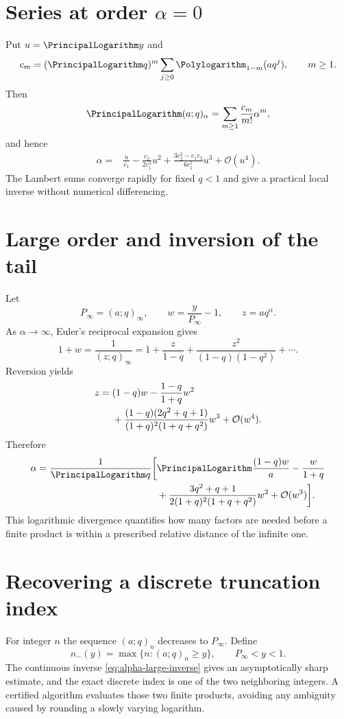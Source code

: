 \documentclass[11pt,oneside]{book}
\theoremstyle{definition}
\theoremstyle{remark}
\newcommand{\OO}{\mathcal{O}}
\begin{document}
\section{Series at order $\alpha=0$}
Put $u=\PrincipalLogarithm y$ and
\[
 c_m=(\PrincipalLogarithm q)^m\sum_{j\ge0}\Polylogarithm_{1-m}(aq^j),\qquad m\ge1.
\]
Then
\[
 \PrincipalLogarithm(a;q)_\alpha
 =\sum_{m\ge1}\frac{c_m}{m!}\alpha^m,
\]
and hence
\begin{align}
 \alpha={}&\frac{u}{c_1}-\frac{c_2}{2c_1^3}u^2
 +\frac{3c_2^2-c_1c_3}{6c_1^5}u^3+\OO(u^4).
 \label{eq:alpha-near-zero-inverse}
\end{align}
The Lambert sums converge rapidly for fixed $q<1$ and give a practical local
inverse without numerical differencing.

\section{Large order and inversion of the tail}
Let
\[
 P_\infty=(a;q)_\infty,
 \qquad w=\frac{y}{P_\infty}-1,
 \qquad z=aq^\alpha.
\]
As $\alpha\to\infty$, Euler's reciprocal expansion gives
\[
 1+w=\frac1{(z;q)_\infty}
 =1+\frac{z}{1-q}
 +\frac{z^2}{(1-q)(1-q^2)}+\cdots.
\]
Reversion yields
\begin{align}
 z={}&(1-q)w-\frac{1-q}{1+q}w^2\notag\\
 &+\frac{(1-q)(2q^2+q+1)}{(1+q)^2(1+q+q^2)}w^3
 +\OO(w^4).
 \label{eq:z-tail-inverse}
\end{align}
Therefore
\begin{align}
 \alpha={1\over\PrincipalLogarithm q}\biggl[&\PrincipalLogarithm\frac{(1-q)w}{a}
 -\frac{w}{1+q}\notag\\
 &+\frac{3q^2+q+1}{2(1+q)^2(1+q+q^2)}w^2
 +\OO(w^3)\biggr].
 \label{eq:alpha-large-inverse}
\end{align}
This logarithmic divergence quantifies how many factors are needed before a
finite product is within a prescribed relative distance of the infinite one.

\section{Recovering a discrete truncation index}
For integer $n$ the sequence $(a;q)_n$ decreases to $P_\infty$.  Define
\[
 n_-(y)=\max\{n:(a;q)_n\ge y\},
 \qquad P_\infty<y<1.
\]
The continuous inverse \eqref{eq:alpha-large-inverse} gives an asymptotically
sharp estimate, and the exact discrete index is one of the two neighboring
integers.  A certified algorithm evaluates those two finite products, avoiding
any ambiguity caused by rounding a slowly varying logarithm.
\end{document}
